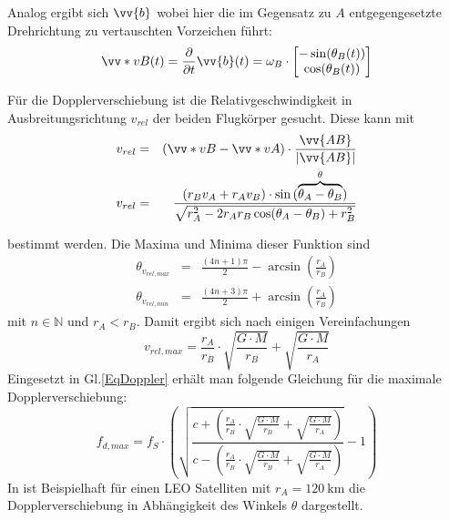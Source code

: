 Analog ergibt sich $\vv{b}$ wobei hier die im Gegensatz zu $A$ entgegengesetzte Drehrichtung zu vertauschten Vorzeichen führt:
\begin{equation}
    \vv*{v}{B}(t)=\frac{\partial}{\partial t}\vv{b}(t)
    = \omega_B \cdot \begin{bmatrix} 
        -\sin(\theta_B(t))\\ 
        \cos(\theta_B(t)) 
    \end{bmatrix}
\end{equation}

Für die Dopplerverschiebung ist die Relativgeschwindigkeit in Ausbreitungsrichtung $v_{rel}$ der beiden Flugkörper gesucht. Diese kann mit 
\begin{eqnarray}
    v_{rel} &=&(\vv*{v}{B}-\vv*{v}{A} ) \cdot \frac{\vv{AB}}{|\vv{AB}|}\\
     v_{rel} &=& \frac{(r_B v_A + r_A v_B) \cdot \sin{(\overbrace{\theta_A-\theta_B}^{\theta}})}{\sqrt{r_A^2-2 r_A r_B \cos(\theta_A-\theta_B)+r_B^2}}
\end{eqnarray}

bestimmt werden. Die Maxima und Minima dieser Funktion sind
\begin{eqnarray}
    \theta_{v_{rel,max}}&=&\frac{(4n+1)\pi}{2}-\arcsin\left(\frac{r_A}{r_B}\right)\\
    \theta_{v_{rel,min}}&=&\frac{(4n+3)\pi}{2}+\arcsin\left(\frac{r_A}{r_B}\right)
\end{eqnarray}
mit $n\in \mathbb{N}$ und $r_A<r_B$. Damit ergibt sich nach einigen Vereinfachungen
\begin{equation}
    v_{rel,max}=\frac{r_A}{r_B}\cdot \sqrt{\frac{G \cdot M}{r_B}} + \sqrt{\frac{G\cdot M}{r_A}}
\end{equation}
Eingesetzt in Gl.\ref{EqDoppler} erhält man folgende Gleichung für die maximale Dopplerverschiebung:
\begin{equation}
	f_{d,max} = f_S \cdot \left(\sqrt{\frac{c+\left(\frac{r_A}{r_B}\cdot \sqrt{\frac{G \cdot M}{r_B}} + \sqrt{\frac{G\cdot M}{r_A}}\right)}{c-\left(\frac{r_A}{r_B}\cdot \sqrt{\frac{G \cdot M}{r_B}} + \sqrt{\frac{G\cdot M}{r_A}}\right)}}-1\right)
\end{equation}
In  ist Beispielhaft für einen \gls{LEO} Satelliten mit $r_A=\SI{120}{\km}$ die Dopplerverschiebung in Abhängigkeit des Winkels $\theta$ dargestellt. 



